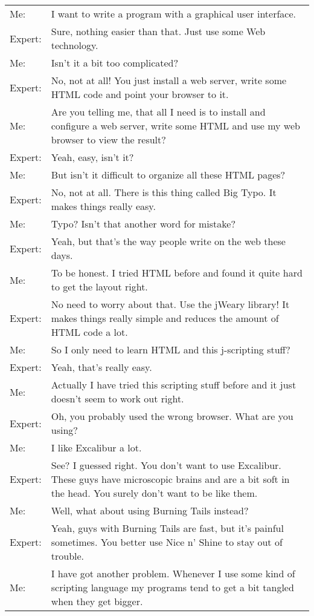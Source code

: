 \begin{longtable}{lp{11cm}}
Me: & I want to write a program with a graphical user interface.\\
Expert: & Sure, nothing easier than that. Just use some Web technology.\\
Me: & Isn't it a bit too complicated?\\
Expert: & No, not at all! You just install a web server, write some HTML
code and point your browser to it.\\
Me: & Are you telling me, that all I need is to install and configure a
web server, write some HTML and use my web browser to view the result?\\
Expert: & Yeah, easy, isn't it?\\
Me: & But isn't it difficult to organize all these HTML pages?\\
Expert: & No, not at all. There is this thing called Big Typo. It makes
things really easy.\\
Me: & Typo? Isn't that another word for mistake?\\
Expert: & Yeah, but that's the way people write on the web these days.\\
Me: & To be honest. I tried HTML before and found it quite hard to get
the layout right.\\
Expert: & No need to worry about that. Use the jWeary library! It makes
things really simple and reduces the amount of HTML code a lot.\\
Me: & So I only need to learn HTML and this j-scripting stuff?\\
Expert: & Yeah, that's really easy.\\
Me: & Actually I have tried this scripting stuff before and it just
doesn't seem to work out right.\\
Expert: & Oh, you probably used the wrong browser. What are you using?\\
Me: & I like Excalibur a lot.\\
Expert: & See? I guessed right. You don't want to use Excalibur. These
guys have microscopic brains and are a bit soft in the head. You surely
don't want to be like them.\\
Me: & Well, what about using Burning Tails instead?\\
Expert: & Yeah, guys with Burning Tails are fast, but it's painful
sometimes. You better use Nice n' Shine to stay out of trouble.\\
Me: & I have got another problem. Whenever I use some kind of scripting
language my programs tend to get a bit tangled when they get bigger.\\

\end{longtable}
